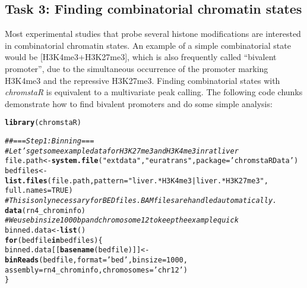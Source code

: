 \documentclass[11pt]{article}\usepackage[]{graphicx}\usepackage[]{color}
\makeatletter
\newcommand{\hlnum}[1]{\textcolor[rgb]{0.686,0.059,0.569}{#1}}%
\newcommand{\hlstr}[1]{\textcolor[rgb]{0.192,0.494,0.8}{#1}}%
\newcommand{\hlcom}[1]{\textcolor[rgb]{0.678,0.584,0.686}{\textit{#1}}}%
\newcommand{\hlstd}[1]{\textcolor[rgb]{0.345,0.345,0.345}{#1}}%
\newcommand{\hlkwa}[1]{\textcolor[rgb]{0.161,0.373,0.58}{\textbf{#1}}}%
\newcommand{\hlkwb}[1]{\textcolor[rgb]{0.69,0.353,0.396}{#1}}%
\newcommand{\hlkwc}[1]{\textcolor[rgb]{0.333,0.667,0.333}{#1}}%
\newcommand{\hlkwd}[1]{\textcolor[rgb]{0.737,0.353,0.396}{\textbf{#1}}}%
\newenvironment{kframe}{%
 \def\at@end@of@kframe{}%
 \ifinner\ifhmode%
  \def\at@end@of@kframe{\end{minipage}}%
  \begin{minipage}{\columnwidth}%
 \fi\fi%
 \def\FrameCommand##1{\hskip\@totalleftmargin \hskip-\fboxsep
 \colorbox{shadecolor}{##1}\hskip-\fboxsep
     \hskip-\linewidth \hskip-\@totalleftmargin \hskip\columnwidth}%
 \MakeFramed {\advance\hsize-\width
   \@totalleftmargin\z@ \linewidth\hsize
   \@setminipage}}%
 {\par\unskip\endMakeFramed%
 \at@end@of@kframe}
\newenvironment{knitrout}{}{} %
\newcommand{\Rpackage}[1]{{\textit{#1}}}
\makeatother
\begin{document}
\subsection{Task 3: Finding combinatorial chromatin states}

Most experimental studies that probe several histone modifications are interested in combinatorial chromatin states. An example of a simple combinatorial state would be [H3K4me3+H3K27me3], which is also frequently called ``bivalent promoter'', due to the simultaneous occurrence of the promoter marking H3K4me3 and the repressive H3K27me3. Finding combinatorial states with \Rpackage{chromstaR} is equivalent to a multivariate peak calling. The following code chunks demonstrate how to find bivalent promoters and do some simple analysis:

\begin{scriptsize}
\begin{knitrout}
\color{fgcolor}\begin{kframe}
\begin{alltt}
\hlkwd{library}\hlstd{(chromstaR)}
\end{alltt}
\end{kframe}
\end{knitrout}

\begin{knitrout}
\color{fgcolor}\begin{kframe}
\begin{alltt}
\hlcom{## === Step 1: Binning ===}
\hlcom{# Let's get some example data for H3K27me3 and H3K4me3 in rat liver}
\hlstd{file.path} \hlkwb{<-} \hlkwd{system.file}\hlstd{(}\hlstr{"extdata"}\hlstd{,}\hlstr{"euratrans"}\hlstd{,} \hlkwc{package}\hlstd{=}\hlstr{'chromstaRData'}\hlstd{)}
\hlstd{bedfiles} \hlkwb{<-} \hlkwd{list.files}\hlstd{(file.path,} \hlkwc{pattern}\hlstd{=}\hlstr{"liver.*H3K4me3|liver.*H3K27me3"}\hlstd{,}
                       \hlkwc{full.names}\hlstd{=}\hlnum{TRUE}\hlstd{)}
\hlcom{# This is only necessary for BED files. BAM files are handled automatically.}
\hlkwd{data}\hlstd{(rn4_chrominfo)}
\hlcom{# We use bin size 1000bp and chromosome 12 to keep the example quick}
\hlstd{binned.data} \hlkwb{<-} \hlkwd{list}\hlstd{()}
\hlkwa{for} \hlstd{(bedfile} \hlkwa{in} \hlstd{bedfiles) \{}
  \hlstd{binned.data[[}\hlkwd{basename}\hlstd{(bedfile)]]} \hlkwb{<-} \hlkwd{binReads}\hlstd{(bedfile,} \hlkwc{format}\hlstd{=}\hlstr{'bed'}\hlstd{,} \hlkwc{binsize}\hlstd{=}\hlnum{1000}\hlstd{,}
                                         \hlkwc{assembly}\hlstd{=rn4_chrominfo,} \hlkwc{chromosomes}\hlstd{=}\hlstr{'chr12'}\hlstd{)}
\hlstd{\}}
\end{alltt}
\end{kframe}
\end{knitrout}


\end{scriptsize}
\end{document}
